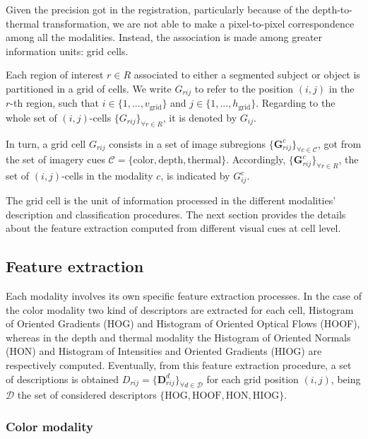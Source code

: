 \documentclass[10pt,twocolumn,letterpaper]{article}
\begin{document}
Given the precision got in the registration, particularly because of the depth-to-thermal transformation, we are not able to make a pixel-to-pixel correspondence among all the modalities. Instead, the association is made among greater information units: grid cells. 

Each region of interest $r \in R$ associated to either a segmented subject or object is partitioned in a grid of cells. We write $G_{rij}$ to refer to the position $(i,j)$ in the $r$-th region, such that $i \in \{ 1,...,v_\mathrm{grid} \}$ and $j \in \{ 1,...,h_\mathrm{grid} \}$. Regarding to the whole set of $(i,j)$-cells $\{G_{rij}\}_{\forall r \in R}$, it is denoted by $G_{ij}$.

In turn, a grid cell $G_{rij}$ consists in a set of image subregions $\{\mathbf{G}_{rij}^c\}_{\forall{c} \in \mathcal{C}}$, got from the set of imagery cues $\mathcal{C} = \{\mathrm{color}, \mathrm{depth}, \mathrm{thermal}\}$. Accordingly, $\{\mathbf{G}_{rij}^c\}_{\forall r \in R}$, the set of $(i,j)$-cells in the modality $c$, is indicated by $G_{ij}^c$.

The grid cell is the unit of information processed in the different modalities' description and classification procedures. The next section provides the details about the feature extraction computed from different visual cues at cell level.

\subsection{Feature extraction}
\label{ssec:feature extraction}

Each modality involves its own specific feature extraction processes. In the case of the color modality two kind of descriptors are extracted for each cell, Histogram of Oriented Gradients (HOG) and Histogram of Oriented Optical Flows (HOOF), whereas in the depth and thermal modality the Histogram of Oriented Normals (HON) and Histogram of Intensities and Oriented Gradients (HIOG) are respectively computed. Eventually, from this feature extraction procedure, a set of descriptions is obtained $D_{rij} = \{\mathbf{D}_{rij}^d\}_{\forall d \in \mathcal{D}}$ for each grid position $(i,j)$, being $\mathcal{D}$ the set of considered descriptors $\{\mathrm{HOG}, \mathrm{HOOF}, \mathrm{HON}, \mathrm{HIOG}\}$.

\subsubsection{Color modality}
\label{sssec:color}
\end{document}
